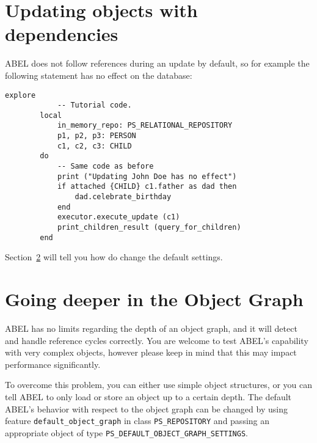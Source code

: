 \documentclass[a4paper,12pt]{report}
\begin{document}
\section{Updating objects with dependencies}
ABEL does not follow references during an update by default, so for example the following statement has no effect on the database:

\begin{lstlisting}[language=OOSC2Eiffel, captionpos=b, caption={References are not followed by default during updates.}, label={lst:reference_update}]
	explore
			-- Tutorial code.
		local
			in_memory_repo: PS_RELATIONAL_REPOSITORY
			p1, p2, p3: PERSON
			c1, c2, c3: CHILD
		do
			-- Same code as before
			print ("Updating John Doe has no effect")
			if attached {CHILD} c1.father as dad then
				dad.celebrate_birthday
			end
			executor.execute_update (c1)
			print_children_result (query_for_children)
		end
\end{lstlisting}
Section~\ref{sec:going_deeper_in_object_graph} will tell you how do change the default settings.
 
\section{Going deeper in the Object Graph}
\label{sec:going_deeper_in_object_graph}
ABEL has no limits regarding the depth of an object graph, and it will detect and handle reference cycles correctly. 
You are welcome to test ABEL's capability with very complex objects, however please keep in mind that this may impact performance significantly.

To overcome this problem, you can either use simple object structures, or you can tell ABEL to only load or store an object up to a certain depth.
The default ABEL's behavior with respect to the object graph can be changed by using feature \lstinline{default_object_graph} in class \lstinline{PS_REPOSITORY} and passing an appropriate object of type \lstinline{PS_DEFAULT_OBJECT_GRAPH_SETTINGS}.
\end{document}
